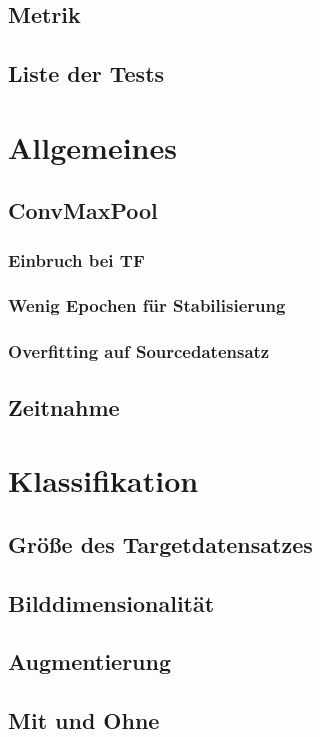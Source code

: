 \documentclass[ngerman]{report}
\begin{document}
    \section{Metrik}
    
    \section{Liste der Tests}
    

    \chapter{Allgemeines}  %
    \section{ConvMaxPool}
    \subsection{Einbruch bei TF}
    \subsection{Wenig Epochen für Stabilisierung}
    \subsection{Overfitting auf Sourcedatensatz}
    \section{Zeitnahme}

    \chapter{Klassifikation}  %
    \section{Größe des Targetdatensatzes}
    \section{Bilddimensionalität}
    \section{Augmentierung}
    \section{Mit und Ohne}
\end{document}
